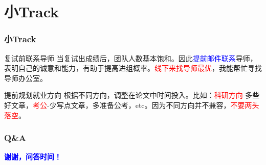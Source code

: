 \documentclass[slide]{../custom}
\begin{document}
\section{小Track}

\begin{frame}
  \frametitle{小Track}
  \begin{block}{复试前联系导师}
    当复试出成绩后，团队人数基本饱和。因此\textcolor{blue}{提前邮件联系}导师，表明自己的诚意和能力，有助于提高进组概率。\textcolor{red}{线下来找导师最优}，我能帮忙寻找导师办公室。
  \end{block}

  \begin{alertblock}{提前规划就业方向}
    根据不同方向，调整在论文中时间投入。比如：\textcolor{red}{科研方向}-多些好文章，\textcolor{red}{考公}-少写点文章，多准备公考，etc。因为不同方向并不兼容，\textcolor{red}{不要两头落空}。
  \end{alertblock}
\end{frame}

\begin{frame}
  \frametitle{Q\&A}
  \begin{center}
    \Huge\bfseries\textcolor{blue}{谢谢，问答时间！}
  \end{center}
  \footnotesize
\end{frame}

%   
%   
\end{document}
